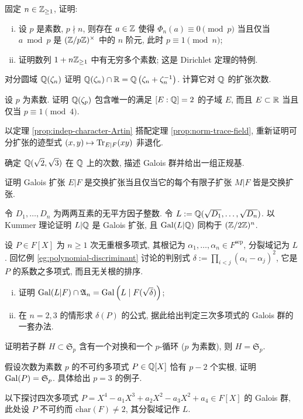 \begin{Exercises}
	\item 固定 $n \in \mathbb{Z}_{\geq 1}$, 证明:
		\begin{enumerate}[(i)]
			\item 设 $p$ 是素数, $p \nmid n$, 则存在 $a \in \mathbb{Z}$ 使得 $\Phi_n(a) \equiv 0 \pmod p$ 当且仅当 $a \bmod p$ 是 $(\mathbb{Z}/p\mathbb{Z})^\times$ 中的 $n$ 阶元, 此时 $p \equiv 1 \pmod n$;
			\item 证明数列 $1 + n\mathbb{Z}_{\geq 1}$ 中有无穷多个素数; 这是 Dirichlet 定理的特例.
		\end{enumerate}
	\item 对分圆域 $\mathbb{Q}(\zeta_n)$ 证明 $\mathbb{Q}(\zeta_n) \cap \mathbb{R} = \mathbb{Q}\left( \zeta_n + \zeta_n^{-1} \right)$. 计算它对 $\mathbb{Q}$ 的扩张次数.
	\item 设 $p$ 为素数. 证明 $\mathbb{Q}(\zeta_p)$ 包含唯一的满足 $[E:\mathbb{Q}]=2$ 的子域 $E$, 而且 $E \subset \mathbb{R}$ 当且仅当 $p \equiv 1 \pmod{4}$.
	\item 以定理 \ref{prop:indep-character-Artin} 搭配定理 \ref{prop:norm-trace-field}, 重新证明可分扩张的迹型式 $(x,y) \mapsto \operatorname{Tr}_{E|F}(xy)$ 非退化.
	\item 确定 $\mathbb{Q}(\sqrt{2},\sqrt{3})$ 在 $\mathbb{Q}$ 上的次数, 描述 Galois 群并给出一组正规基.
	\item 证明 Galois 扩张 $E|F$ 是交换扩张当且仅当它的每个有限子扩张 $M|F$ 皆是交换扩张.
	\item 令 $D_1, \ldots, D_n$ 为两两互素的无平方因子整数. 令 $L := \mathbb{Q}(\sqrt{D_1}, \ldots, \sqrt{D_n})$. 以 Kummer 理论证明 $L|\mathbb{Q}$ 是 Galois 扩张, 且 $\operatorname{Gal}(L|\mathbb{Q})$ 同构于 $(\mathbb{Z}/2\mathbb{Z})^n$.
	\item 设 $P \in F[X]$ 为 $n \geq 1$ 次无重根多项式, 其根记为 $\alpha_1, \ldots, \alpha_n \in F^\text{sep}$, 分裂域记为 $L$. 回忆例 \ref{eg:polynomial-discriminant} 讨论的判别式 $\delta := \prod_{i < j} (\alpha_i - \alpha_j)^2$, 它是 $P$ 的系数之多项式, 而且无关根的排序.
		\begin{enumerate}[(i)]
			\item 证明 $\operatorname{Gal}(L|F) \cap \mathfrak{A}_n = \operatorname{Gal}\left( L \;|\; F(\sqrt{\delta}) \right)$;
			\item 在 $n=2, 3$ 的情形求 $\delta(P)$ 的公式, 据此给出判定三次多项式的 Galois 群的一套办法.
		\end{enumerate}
	\item 证明若子群 $H \subset \mathfrak{S}_p$ 含有一个对换和一个 $p$-循环 ($p$ 为素数), 则 $H = \mathfrak{S}_p$.
	\item 假设次数为素数 $p$ 的不可约多项式 $P \in \mathbb{Q}[X]$ 恰有 $p-2$ 个实根, 证明 $\operatorname{Gal}(P) = \mathfrak{S}_p$. 具体给出 $p=3$ 的例子.
	\item 以下探讨四次多项式 $P = X^4 - a_1 X^3 + a_2 X^2 -a_3 X^2 + a_4 \in F[X]$ 的 Galois 群, 此处设 $P$ 不可约而 $\text{char}(F) \neq 2$, 其分裂域记作 $L$.

\end{Exercises}
